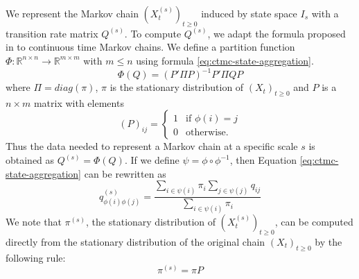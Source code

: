 We represent the Markov chain $(X_t^{(s)})_{t \ge 0}$ induced by state space $I_s$ with a transition
rate matrix $Q^{(s)}$. To compute $Q^{(s)}$, we adapt the formula
proposed in \cite{5746509} to continuous time Markov chains. We define a partition function
$\Phi: \mathbb{R}^{n \times n} \rightarrow \mathbb{R}^{m \times m}$ with $m \le n$ using formula \ref{eq:ctmc-state-aggregation}.
\begin{equation}
	\label{eq:ctmc-state-aggregation}
	\Phi(Q) = (P' \Pi P)^{-1} P' \Pi Q P
\end{equation}
where $\Pi = diag(\pi)$, $\pi$ is the stationary distribution of $(X_t)_{t \ge 0}$ and $P$ is a 
$n \times m$ matrix with elements
\begin{equation}
	\nonumber
	\left(P\right)_{ij} = 
		\left\{
			\begin{array}{ll}
				1 & \mbox{if } \phi(i) = j \\
				0 & \mbox{otherwise}.
			\end{array}
		\right.
\end{equation}
Thus the data needed to represent a Markov chain at a specific scale $s$ is obtained as $Q^{(s)} = \Phi(Q)$.
If we define $\psi = \phi \circ \phi^{-1}$, then Equation \ref{eq:ctmc-state-aggregation} can be rewritten as
\begin{equation}
	\nonumber
	q_{\phi(i)\phi(j)}^{(s)} = \frac{\sum\limits_{i \in \psi(i)}\pi_i \sum\limits_{j \in \psi(j)} q_{ij}}{\sum\limits_{i \in \psi(i)}\pi_i}
\end{equation}
We note that $\pi^{(s)}$, the stationary distribution of $(X_t^{(s)})_{t \ge 0}$, can be computed directly from
the stationary distribution of the original chain $(X_t)_{t \ge 0}$ by the following rule:
\begin{equation}
	\nonumber
	\pi^{(s)} = \pi P
\end{equation}